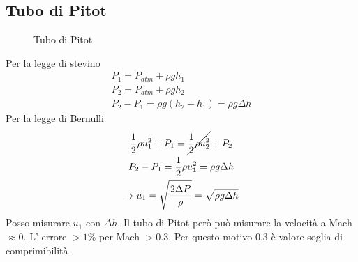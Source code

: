 \subsection{Tubo di Pitot}
\begin{figure}[ht]
    \centering
    \caption{Tubo di Pitot}
    \label{fig:tubo_di_pitot}
\end{figure}
Per la legge di stevino 
\begin{gather*}
  P_1=P_{atm}+\rho g h_1\\
  P_2=P_{atm}+\rho g h_2\\
  P_2-P_1=\rho g \left( h_2-h_1\right) =\rho g \Delta h
\end{gather*}
Per la legge di Bernulli
\begin{gather*}
  \frac{1}{2}\rho u^2_1 + P_1 = \cancel{\frac{1}{2}\rho u^2_2} + P_2\\
  P_2 -P_1 = \frac{1}{2}\rho u^2_1 = \rho g \Delta h\\
  \rightarrow u_1 = \sqrt{\frac{{2\Delta P}}{\rho }}= \sqrt{{\rho g\Delta h}} 
\end{gather*}
Posso misurare $ u_1 $ con $ \Delta h $. Il tubo di Pitot però può misurare la velocità a Mach $ \approx 0 $. L' errore $ >1\% $ per Mach $ >0.3 $. Per questo motivo $ 0.3 $ è valore soglia di comprimibilità

